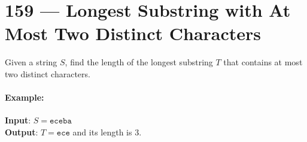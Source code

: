\section{159 --- Longest Substring with At Most Two Distinct Characters}
Given a string $S$, find the length of the longest substring $T$ that contains at most two distinct characters.
\par
\paragraph{Example:}
\begin{flushleft}
\textbf{Input}: $S = \texttt{eceba}$
\\
\textbf{Output}: $T=\texttt{ece}$ and its length is 3.
\end{flushleft}
